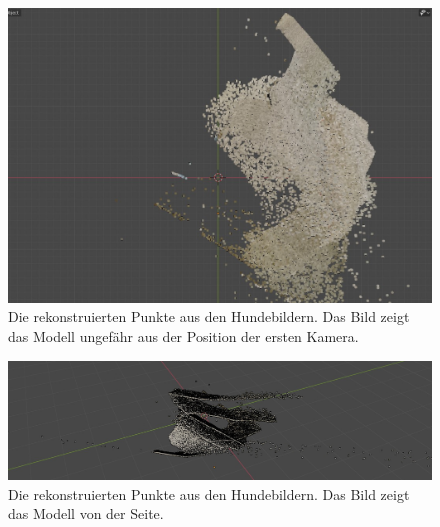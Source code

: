 \begin{figure}
    \includegraphics[width=\textwidth]{src/img/dog_model.jpg}
    \caption{Die rekonstruierten Punkte aus den Hundebildern. Das Bild zeigt das Modell ungefähr aus der Position der ersten Kamera.}
    \label{fig:dog-model}
\end{figure}

\begin{figure}
    \includegraphics[width=\textwidth]{src/img/dog_model_2.jpg}
    \caption{Die rekonstruierten Punkte aus den Hundebildern. Das Bild zeigt das Modell von der Seite.}
    \label{fig:dog-model-2}
\end{figure}
